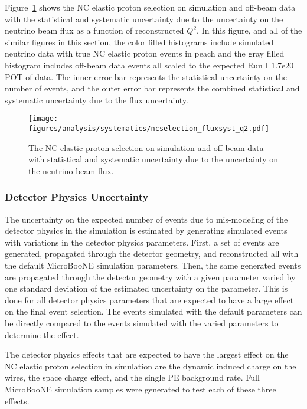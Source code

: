     Figure~\ref{fig:systflux} shows the NC elastic proton selection on
    simulation and off-beam data with the statistical and systematic
    uncertainty due to the uncertainty on the neutrino beam flux as a function
    of reconstructed $Q^2$. In this figure, and all of the similar figures in
    this section, the color filled histograms include simulated neutrino data
    with true NC elastic proton events in peach and the gray filled histogram
    includes off-beam data events all scaled to the expected Run I 1.7e20 POT
    of data.  The inner error bar represents the statistical uncertainty on the
    number of events, and the outer error bar represents the combined
    statistical and systematic uncertainty due to the flux uncertainty.
    \begin{figure}[ht]
      \centering
      \texttt{[image: figures/analysis/systematics/ncselection\_fluxsyst\_q2.pdf]}
      \caption{The NC elastic proton selection on simulation and off-beam data
      with statistical and systematic uncertainty due to the uncertainty on the
      neutrino beam flux.}
      \label{fig:systflux}
    \end{figure}


  \subsubsection{Detector Physics Uncertainty}\label{sec:detvar}
    The uncertainty on the expected number of events due to mis-modeling of the
    detector physics in the simulation is estimated by generating simulated
    events with variations in the detector physics parameters. First, a set of
    events are generated, propagated through the detector geometry, and
    reconstructed all with the default MicroBooNE simulation parameters. Then,
    the same generated events are propagated through the detector geometry with
    a given parameter varied by one standard deviation of the estimated
    uncertainty on the parameter. This is done for all detector physics
    parameters that are expected to have a large effect on the final event
    selection. The events simulated with the default parameters can be directly
    compared to the events simulated with the varied parameters to determine
    the effect. 
    
    The detector physics effects that are expected to have the largest effect
    on the NC elastic proton selection in simulation are the dynamic induced
    charge on the wires, the space charge effect, and the single PE background
    rate. Full MicroBooNE simulation samples were generated to test each of
    these three effects. 

